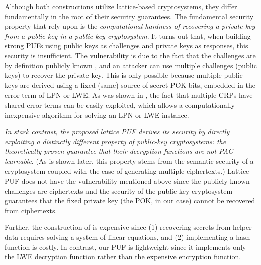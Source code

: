Although both constructions utilize lattice-based cryptosystems, they differ fundamentally in the root of their security guarantees.
The fundamental security property that \cite{fuller2013computational} rely upon is the \emph{computational hardness of recovering a private key from a public key in a public-key cryptosystem}. 
It turns out that, when building strong PUFs using public keys as challenges and private keys as responses, this security is insufficient. The vulnerability is due to the fact that the challenges are by definition publicly known \cite{fuller2013computational,herder2017trapdoor,jin2017fpga}, and an attacker can use multiple challenges (public keys) to recover the private key. This is only possible because multiple public keys are derived using a fixed (same) source of secret POK bits, embedded in the error term of LPN or LWE. As was shown in \cite{apon2017efficient}, the fact that multiple CRPs have shared error terms can be easily exploited, which allows a computationally-inexpensive algorithm for solving an LPN or LWE instance. %

\emph{In stark contrast, the proposed lattice PUF derives its security by directly exploiting a distinctly different property of public-key cryptosystems: the theoretically-proven guarantee that their decryption functions are not PAC learnable}. 
(As is shown later, this property stems from the semantic security of a cryptosystem coupled with the ease of generating multiple ciphertexts.) 
Lattice PUF does not have the vulnerability mentioned above since the publicly known challenges are ciphertexts and the security of the public-key cryptosystem guarantees that the fixed private key (the POK, in our case) cannot be recovered from ciphertexts.

Further, the construction of  \cite{herder2017trapdoor,jin2017fpga} is expensive since (1) recovering secrets from helper data requires solving a system of linear equations, and (2) implementing a hash function is costly.  
In contrast, our PUF is lightweight since it implements only the LWE decryption function rather than the expensive encryption function.

